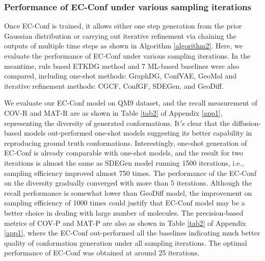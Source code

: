 \documentclass{article} %
\begin{document}
\begin{comment}
\begin{figure*}[htbp]
	\centering
	\centerline{\texttt{[image: visual.png]}}
	\caption{Examples of generated structures for 8 random selected molecules in GEOM-Drugs test set with different methods.}
	\label{fig4}
\end{figure*}
\end{comment}


\subsubsection{Performance of EC-Conf under various sampling iterations}
Once EC-Conf is trained, it allows either one step generation from the prior Gaussian distribution or carrying out iterative refinement via chaining the outputs of multiple time steps as shown in Algorithm \ref{algorithm2}. Here, we evaluate the performance of EC-Conf under various sampling iterations. In the meantime, rule based ETKDG method and 7 ML-based baselines were also compared, including one-shot methods: GraphDG, ConfVAE, GeoMol and iterative refinement methods: CGCF, ConfGF, SDEGen, and GeoDiff.





We evaluate our EC-Conf model on QM9 dataset, and the recall measurement of COV-R and MAT-R are as shown in Table \ref{tab2} of Appendix \ref{app1}, representing the diversity of generated conformations. It$'$s clear that the diffusion-based models out-performed one-shot models suggesting its better capability in reproducing ground truth conformations. Interestingly, one-shot generation of EC-Conf is already comparable with one-shot models, and the result for two iterations is almost the same as SDEGen model running 1500 iterations, i.e., sampling efficiency improved almost 750 times. The performance of the EC-Conf on the diversity gradually converged with more than 5 iterations. Although the recall performance is somewhat lower than GeoDiff model, the improvement on sampling efficiency of 1000 times could justify that EC-Conf model may be a better choice in dealing with large number of molecules. The precision-based metrics of COV-P and MAT-P are also as shown in Table \ref{tab2}  of Appendix \ref{app1}, where the EC-Conf out-performed all the baselines indicating much better quality of conformation generation under all sampling iterations. The optimal performance of EC-Conf was obtained at around 25 iterations. 
\end{document}
